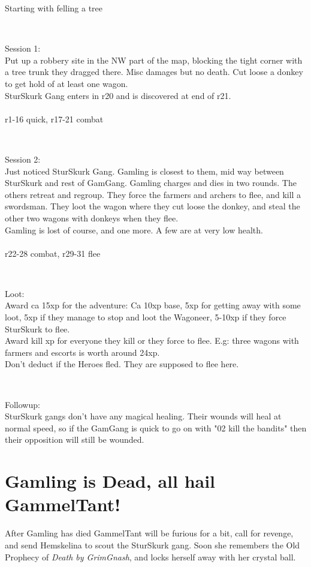 Starting with felling a tree

\

Session 1:\\
Put up a robbery site in the NW part of the map, blocking the tight corner with a tree trunk they dragged there. Misc damages but no death. Cut loose a donkey to get hold of at least one wagon.\\
SturSkurk Gang enters in r20 and is discovered at end of r21.\\
\\
r1-16 quick, r17-21 combat

\

Session 2:\\
Just noticed SturSkurk Gang. Gamling is closest to them, mid way between SturSkurk and rest of GamGang. Gamling charges and dies in two rounds. The others retreat and regroup. They force the farmers and archers to flee, and kill a swordsman. They loot the wagon where they cut loose the donkey, and steal the other two wagons with donkeys when they flee.\\
Gamling is lost of course, and one more. A few are at very low health.\\
\\
r22-28 combat, r29-31 flee

\

Loot:\\
Award ca 15xp for the adventure: Ca 10xp base, 5xp for getting away with some loot, 5xp if they manage to stop and loot the Wagoneer, 5-10xp if they force SturSkurk to flee.\\
Award kill xp for everyone they kill or they force to flee. E.g: three wagons with farmers and escorts is worth around 24xp.\\
Don't deduct if the Heroes fled. They are supposed to flee here.

\

Followup:\\
SturSkurk gangs don't have any magical healing. Their wounds will heal at normal speed, so if the GamGang is quick to go on with "02 kill the bandits" then their opposition will still be wounded.


\section*{Gamling is Dead, all hail GammelTant!}

After Gamling has died GammelTant will be furious for a bit, call for revenge, and send Hemskelina to scout the SturSkurk gang. Soon she remembers the Old Prophecy of \emph{Death by GrimGnash}, and locks herself away with her crystal ball.

